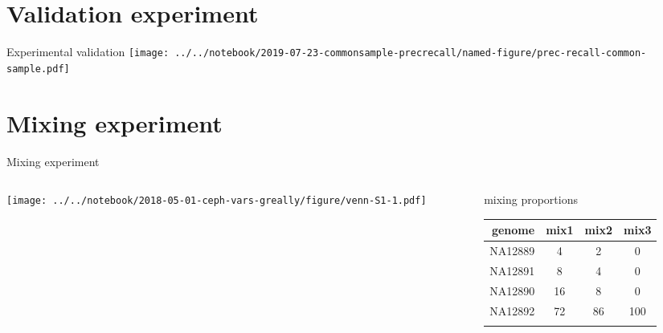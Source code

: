 \documentclass{beamer}
\begin{document}
\section{Validation experiment}

\begin{frame}{Experimental validation}
\texttt{[image: ../../notebook/2019-07-23-commonsample-precrecall/named-figure/prec-recall-common-sample.pdf]}
\end{frame}

\section{Mixing experiment}

\begin{frame}{Mixing experiment}
\begin{columns}[t]
\begin{column}{0.5\textwidth}

\texttt{[image: ../../notebook/2018-05-01-ceph-vars-greally/figure/venn-S1-1.pdf]}
\end{column}

\begin{column}{0.5\textwidth}

{\footnotesize
{\large mixing proportions}

\begin{tabular}{r|ccc}
genome & mix1 & mix2 & mix3 \\
\hline
NA12889 & 4 & 2 & 0 \\
NA12891 & 8 & 4 & 0 \\
NA12890 & 16 & 8 & 0 \\
NA12892 & 72 & 86 & 100 \\
& & & \\
\end{tabular}
}
\end{column}
\end{columns}
\end{frame}
\end{document}
